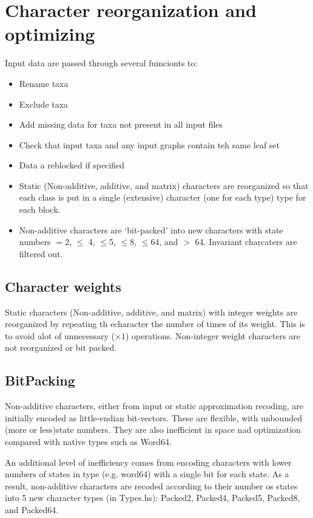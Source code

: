 \documentclass[11pt]{article}
\begin{document}
	\section{Character reorganization and optimizing}
		Input data are passed through several fuincionts to:
		\begin{itemize}
			\item{Rename taxa}
			\item{Exclude taxa}
			\item{Add missing data for taxa not present in all input files}
			\item{Check that input taxa and any input graphs contain teh same leaf set}
			\item{Data a reblocked if specified}
			\item{Static (Non-additive, additive, and matrix) characters are reorganized so that
				each class is put in a single (extensive) character (one for each type) type for each block.}
			\item{Non-additive characters are `bit-packed' into new characters with state numbers $=$2, $\leq$
				4, $\leq$5, $\leq$8, $\leq$64, and $>$ 64. Invariant charcaters are filtered out.}
			 
		\end{itemize}
		\subsection{Character weights}
		Static characters (Non-additive, additive, and matrix) with integer weights are reorganized
		by repeating th echaracter the number of times of its weight.  This is to avoid alot of 
		unnecessary ($\times 1$) operations.  Non-integer weight characters are not reorganized or
		bit packed.
		
		\subsection{BitPacking}
		Non-additive characters, either from input or static approximation recoding, are initially 
		encoded as little-endian bit-vectors.  These are flexible, with unbounded (more or less)state numbers.
		They are also inefficient in space nad optimization compared with native types such as Word64. 
		
		An additional level of inefficiency comes from encoding characters with lower numbers of states in type (e.g. word64) with a single bit for each state.  As a result, non-additive characters are recoded according to their 
		number os states into 5 new character types (in Types.hs): Packed2, Packed4, Packed5, Packed8, and Packed64. 
		
\end{document}

